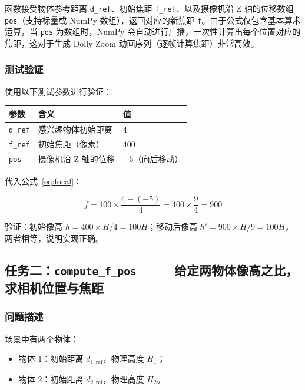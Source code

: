 \documentclass[12pt,a4paper]{ctexart}
\begin{document}
函数接受物体参考距离 \texttt{d\_ref}、初始焦距 \texttt{f\_ref}、以及摄像机沿 Z 轴的位移数组 \texttt{pos}（支持标量或 NumPy 数组），返回对应的新焦距 \texttt{f}。由于公式仅包含基本算术运算，当 \texttt{pos} 为数组时，NumPy 会自动进行广播，一次性计算出每个位置对应的焦距，这对于生成 Dolly Zoom 动画序列（逐帧计算焦距）非常高效。

\subsubsection{测试验证}

使用以下测试参数进行验证：

\begin{center}
\begin{tabular}{lll}
\toprule
参数 & 含义 & 值 \\
\midrule
\texttt{d\_ref} & 感兴趣物体初始距离 & $4$ \\
\texttt{f\_ref} & 初始焦距（像素） & $400$ \\
\texttt{pos}    & 摄像机沿 Z 轴的位移 & $-5$（向后移动） \\
\bottomrule
\end{tabular}
\end{center}

代入公式~\eqref{eq:focal}：

\begin{equation}
  f = 400 \times \frac{4 - (-5)}{4} = 400 \times \frac{9}{4} = 900
\end{equation}

验证：初始像高 $h = 400 \times H / 4 = 100H$；移动后像高 $h' = 900 \times H / 9 = 100H$，两者相等，说明实现正确。

\subsection{任务二：\texttt{compute\_f\_pos} —— 给定两物体像高之比，求相机位置与焦距}

\subsubsection{问题描述}

场景中有两个物体：
\begin{itemize}
  \item 物体 1：初始距离 $d_{1,\text{ref}}$，物理高度 $H_1$；
  \item 物体 2：初始距离 $d_{2,\text{ref}}$，物理高度 $H_2$。
\end{itemize}
\end{document}
